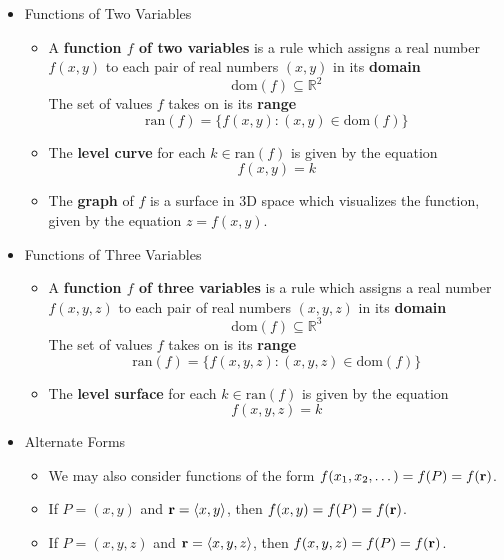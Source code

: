 \begin{itemize}

  \item Functions of Two Variables
    \begin{itemize}
      \item A \textbf{function $f$ of two variables} is a rule which assigns a real number $f(x,y)$ to each pair of real numbers $(x,y)$ in its \textbf{domain} \[\text{dom}(f)\subseteq \mathbb{R}^2\] The set of values $f$ takes on is its \textbf{range} \[\text{ran}(f) = \{f(x,y):(x,y)\in\text{dom}(f)\}\]
      \item The \textbf{level curve} for each $k\in\text{ran}(f)$ is given by the equation \[f(x,y)=k\]
      \item The \textbf{graph} of $f$ is a surface in 3D space which visualizes the function, given by the equation $z=f(x,y)$.
    \end{itemize}

  \item Functions of Three Variables
    \begin{itemize}
      \item A \textbf{function $f$ of three variables} is a rule which assigns a real number $f(x,y,z)$ to each pair of real numbers $(x,y,z)$ in its \textbf{domain} \[\text{dom}(f)\subseteq \mathbb{R}^3\] The set of values $f$ takes on is its \textbf{range} \[\text{ran}(f) = \{f(x,y,z):(x,y,z)\in\text{dom}(f)\}\]
      \item The \textbf{level surface} for each $k\in\text{ran}(f)$ is given by the equation \[f(x,y,z)=k\]
    \end{itemize}

  \item Alternate Forms
    \begin{itemize}
      \item We may also consider functions of the form $f(x_1,x_2,\dots)=f(P)=f(\mathbf{r})$.
      \item If $P=(x,y)$ and $\mathbf{r}=\left<x,y\right>$, then $f(x,y)=f(P)=f(\mathbf{r})$. 
      \item If $P=(x,y,z)$ and $\mathbf{r}=\left<x,y,z\right>$, then $f(x,y,z)=f(P)=f(\mathbf{r})$. 
    \end{itemize}




  

\end{itemize}
